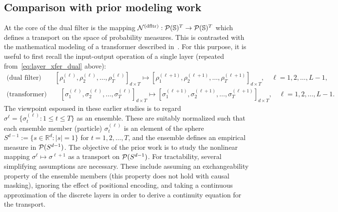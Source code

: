 \documentclass[twoside,11pt]{article}
\def\Re{\mathbb{R}}
\newcommand{\field}[1]{\mathbb{#1}}
\def\Re{\field{R}}
\def\clP{{\cal P}}
\def\bS{\begin{slide}}
\def\Re{\mathbb{R}}
\def\clP{{\cal P}}
\renewcommand{\Re}{\mathbb{R}}
\def\clN{{\cal N}}
\def\clP{{\cal P}}
\def\bS{\mathbb{S}}
\def\dfltr{{\text{\rm (dfltr)}}}
\begin{document}
  




\subsection{Comparison with prior modeling work}
\label{rem:IPS}

  
  
At the core of the dual filter is the mapping $\clN^\dfltr:\clP(\bS)^T\to \clP(\bS)^T$ which
defines a transport on the space of probability measures.  This
is contrasted with the mathematical modeling of a transformer described
in~\citep{geshkovski2023mathematical,geshkovski2024measure,abella2024asymptotic,adu2024approximate,castin2025unified}. 
For this purpose, it is useful to first recall the input-output operation of
a single layer (repeated from~\eqref{eq:layer_xfer_dual} above):
\begin{align*}
   \text{(dual filter)}\qquad
  [\rho_1^{(\ell)},\rho_2^{(\ell)},\hdots,\rho_T^{(\ell)}]_{d\times T}
  \mapsto  [\rho_1^{(\ell+1)},\rho_2^{(\ell+1)},\hdots,\rho_T^{(\ell+1)}]_{d\times T},\quad \ell=1,2,\hdots,L-1,
   \\
     \text{(transformer)}\qquad
  [\sigma_1^{(\ell)},\sigma_2^{(\ell)},\hdots,\sigma_T^{(\ell)}]_{d\times
  T}
  \mapsto  [\sigma_1^{(\ell+1)},\sigma_2^{(\ell+1)},\hdots,\sigma_T^{(\ell+1)}]_{d\times T},\quad \ell=1,2,\hdots,L-1.
\end{align*}
The viewpoint espoused in these earlier studies is to regard 
$\sigma^\ell=\{\sigma_t^{(\ell)}:1\leq t\leq T\}$ as an ensemble.
These are suitably normalized such that each ensemble member
(particle) $\sigma_t^{(\ell)}$ is an element of the sphere 
$S^{d-1}:=\{s\in\Re^d:|s|=1\}$ for $t=1,2,\hdots,T$, and the
ensemble defines an empirical measure in $\clP(S^{d-1})$.  The
objective of the prior work is to study the nonlinear mapping
$\sigma^\ell \mapsto \sigma^{\ell+1}$ as a transport on
$\clP(S^{d-1})$.  For tractability, several simplifying
assumptions are necessary. These include assuming an exchangeability
property of the ensemble members (this property does not hold with
causal masking), ignoring the effect of positional encoding, and
taking a continuous approximation of the discrete layers in order to
derive a continuity equation for the transport. 
\end{document}
